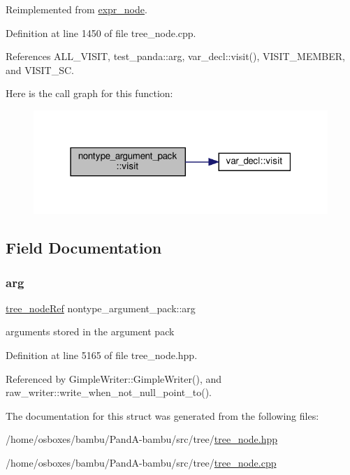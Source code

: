 Reimplemented from \hyperlink{structexpr__node_aac767878f13ca07371dde2c3938ef38a}{expr\+\_\+node}.



Definition at line 1450 of file tree\+\_\+node.\+cpp.



References A\+L\+L\+\_\+\+V\+I\+S\+IT, test\+\_\+panda\+::arg, var\+\_\+decl\+::visit(), V\+I\+S\+I\+T\+\_\+\+M\+E\+M\+B\+ER, and V\+I\+S\+I\+T\+\_\+\+SC.

Here is the call graph for this function\+:
\nopagebreak
\begin{figure}[H]
\begin{center}
\leavevmode
\includegraphics[width=316pt]{d7/dc3/structnontype__argument__pack_a254f0396e0ad2b47a793f8cb7f5b233a_cgraph}
\end{center}
\end{figure}


\subsection{Field Documentation}
\mbox{\label{structnontype__argument__pack_a9db42edf6a44f8dd2ecc8fde8954aae3}} 
\subsubsection{\texorpdfstring{arg}{arg}}
{\footnotesize\ttfamily \hyperlink{tree__node_8hpp_a6ee377554d1c4871ad66a337eaa67fd5}{tree\+\_\+node\+Ref} nontype\+\_\+argument\+\_\+pack\+::arg}



arguments stored in the argument pack 



Definition at line 5165 of file tree\+\_\+node.\+hpp.



Referenced by Gimple\+Writer\+::\+Gimple\+Writer(), and raw\+\_\+writer\+::write\+\_\+when\+\_\+not\+\_\+null\+\_\+point\+\_\+to().



The documentation for this struct was generated from the following files\+:\begin{DoxyCompactItemize}
\item 
/home/osboxes/bambu/\+Pand\+A-\/bambu/src/tree/\hyperlink{tree__node_8hpp}{tree\+\_\+node.\+hpp}\item 
/home/osboxes/bambu/\+Pand\+A-\/bambu/src/tree/\hyperlink{tree__node_8cpp}{tree\+\_\+node.\+cpp}\end{DoxyCompactItemize}
